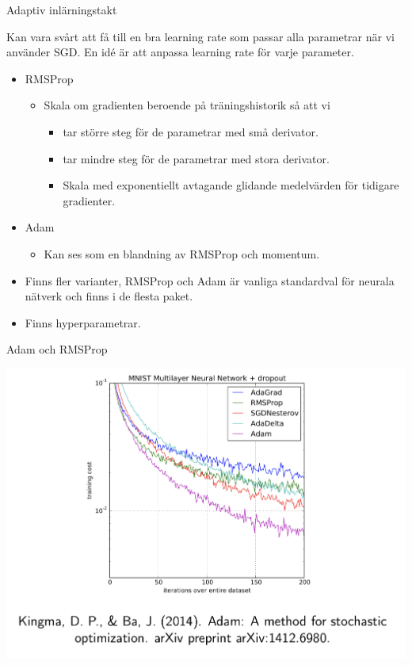 \documentclass[10pt,english]{beamer}
\begin{document}
\begin{frame}{Adaptiv inlärningstakt}

    Kan vara svårt att få till en bra learning rate som passar alla parametrar när vi använder SGD. En idé är att anpassa learning rate för varje parameter.
    \begin{itemize}
        \item RMSProp
        \begin{itemize}
            \item Skala om gradienten beroende på träningshistorik så att vi
            \begin{itemize}
                \item tar större steg för de parametrar med små derivator.
                \item tar mindre steg för de parametrar med stora derivator.
                \item Skala med exponentiellt avtagande glidande medelvärden för tidigare gradienter.
            \end{itemize}
        \end{itemize}
        \item Adam
        \begin{itemize}
            \item Kan ses som en blandning av RMSProp och momentum.
        \end{itemize}
        \item Finns fler varianter, RMSProp och Adam är vanliga standardval för neurala nätverk och finns i de flesta paket.
        \item Finns hyperparametrar.
    \end{itemize}
    
\end{frame}

\begin{frame}{Adam och RMSProp}

    \includegraphics[width = \textwidth]{figs/DL_training_curves.png}
    
\end{frame}
\end{document}
